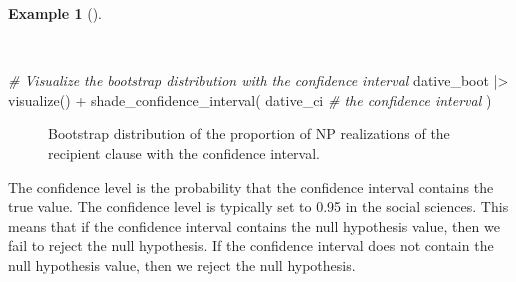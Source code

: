 \documentclass[
  letterpaper,
]{latex/krantz}
\newenvironment{Shaded}{\begin{snugshade}}{\end{snugshade}}
\newcommand{\CommentTok}[1]{\textcolor[rgb]{0.00,0.00,0.00}{\textit{#1}}}
\newcommand{\FunctionTok}[1]{\textcolor[rgb]{0.00,0.00,0.00}{#1}}
\newcommand{\NormalTok}[1]{\textcolor[rgb]{0.00,0.00,0.00}{#1}}
\newcommand{\SpecialCharTok}[1]{\textcolor[rgb]{0.00,0.00,0.00}{#1}}
\theoremstyle{definition}
\newtheorem{example}{Example}[chapter]
\theoremstyle{remark}
\begin{document}
\begin{example}[]\protect\hypertarget{exm-ida-cat-confidence-interval-visualize}{}\label{exm-ida-cat-confidence-interval-visualize}

~

\begin{Shaded}
\begin{Highlighting}[]
\CommentTok{\# Visualize the bootstrap distribution with the confidence interval}
\NormalTok{dative\_boot }\SpecialCharTok{|\textgreater{}}
  \FunctionTok{visualize}\NormalTok{() }\SpecialCharTok{+}
  \FunctionTok{shade\_confidence\_interval}\NormalTok{(}
\NormalTok{    dative\_ci }\CommentTok{\# the confidence interval}
\NormalTok{  )}
\end{Highlighting}
\end{Shaded}

\begin{figure}[H]


\caption{\label{fig-ida-cat-confidence-interval-visualize}Bootstrap
distribution of the proportion of NP realizations of the recipient
clause with the confidence interval.}

\end{figure}%

\end{example}

The confidence level is the probability that the confidence interval
contains the true value. The confidence level is typically set to 0.95
in the social sciences. This means that if the confidence interval
contains the null hypothesis value, then we fail to reject the null
hypothesis. If the confidence interval does not contain the null
hypothesis value, then we reject the null hypothesis.
\end{document}

